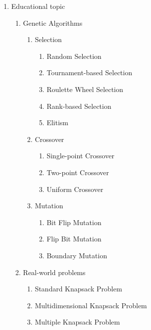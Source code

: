 \documentclass[12pt,oneside,openright,a4paper]{cpe-english-project}
\begin{document}
\begin{enumerate}
\begin{enumerate}
\begin{enumerate}
		\end{enumerate}
	\end{enumerate}
	\item Educational topic
	\begin{enumerate}
		\item Genetic Algorithms
		\begin{enumerate}
			\item Selection
			\begin{enumerate}
				\item Random Selection
				\item Tournament-based Selection
				\item Roulette Wheel Selection
				\item Rank-based Selection
				\item Elitism
			\end{enumerate}
			\item Crossover
			\begin{enumerate}
				\item Single-point Crossover
				\item Two-point Crossover
				\item Uniform Crossover
			\end{enumerate}
			\item Mutation
			\begin{enumerate}
				\item Bit Flip Mutation
				\item Flip Bit Mutation
				\item Boundary Mutation
			\end{enumerate}
		\end{enumerate}
		\item Real-world problems
		\begin{enumerate}
			\item Standard Knapsack Problem
			\item Multidimensional Knapsack Problem
			\item Multiple Knapsack Problem
		\end{enumerate}
	\end{enumerate}
\end{enumerate}

\end{document}
